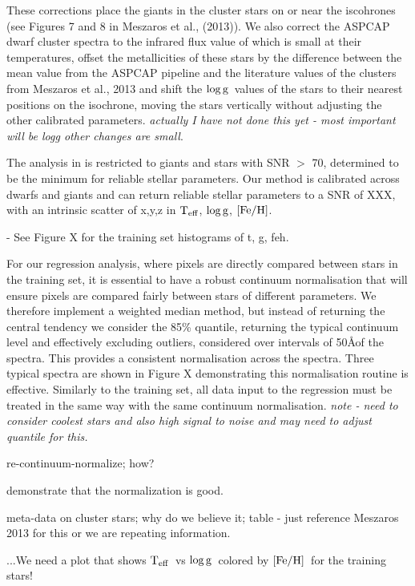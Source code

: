 \documentclass[12pt, preprint]{aastex}
\newcommand{\teff}{\mbox{$\rm T_{eff}$}}
\newcommand{\feh}{\mbox{$\rm [Fe/H]$}}
\newcommand{\logg}{\mbox{$\rm \log g$}}
\begin{document}
These corrections place the giants in the cluster stars on or near the iscohrones (see Figures 7 and 8 in Meszaros et al., (2013)). We  also correct the ASPCAP dwarf cluster spectra to the infrared flux value of \citep{Gonzalez2009} which is small at their temperatures, offset the metallicities of these stars by the difference between the mean value from the ASPCAP pipeline and the literature values of the clusters from Meszaros et al., 2013 and shift the \logg\ values of the stars to their nearest positions on the isochrone, moving the stars vertically without adjusting the other calibrated parameters. \textit{actually I have not done this yet - most important will be logg other changes are small}.

The analysis in \citet{Meszaros2013} is restricted to giants and stars with SNR $>$ 70, determined to be the minimum for reliable stellar parameters. Our method is calibrated across dwarfs and giants and can return reliable stellar parameters to a SNR of XXX, with an intrinsic scatter of x,y,z in \teff, \logg, \feh. 

- See Figure X for the training set histograms of t, g, feh. 

For our regression analysis, where pixels are directly compared between stars in the training set, it is essential to have a robust continuum normalisation that will ensure pixels are compared fairly between stars of different parameters. We therefore implement a weighted median method, but instead of returning the central tendency we consider the 85\% quantile, returning the typical continuum level and effectively excluding outliers, considered over intervals of 50\AA of the spectra. This provides a consistent normalisation across the spectra. Three typical spectra are shown in Figure X demonstrating this normalisation routine is effective. Similarly to the training set, all data input to the regression must be treated in the same way with the same continuum normalisation.
\textit{ note - need to consider coolest stars and also high signal to noise and may need to adjust quantile for this. }

re-continuum-normalize; how?

demonstrate that the normalization is good.

meta-data on cluster stars; why do we believe it; table - just reference Meszaros 2013 for this or we are repeating information. 

...We need a plot that shows \teff\ vs \logg\ colored by \feh\ for the training stars!
\end{document}
